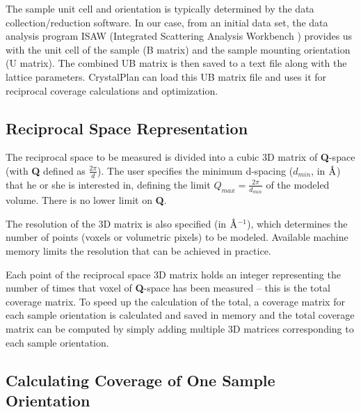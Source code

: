 \documentclass[final]{iucr}              %
\newcommand{\ang}{$\mathrm{\AA} $}
\begin{document}
The sample unit cell and orientation is typically determined by the data
collection/reduction software. In our case, from an initial data set, the data
analysis program ISAW (Integrated Scattering Analysis
Workbench \cite{Mikkelson05}) provides us with the unit cell of the sample (B
matrix) and the sample mounting orientation (U matrix).
The combined UB matrix is then saved to a
text file along with the lattice parameters. 
CrystalPlan can load this UB matrix file and uses it for reciprocal coverage
calculations and optimization.
    
  
\subsection{Reciprocal Space Representation}

The reciprocal space to be measured is divided into a cubic 3D matrix 
of {\bf Q}-space (with {\bf Q} defined as $\frac{2\pi}{d}$). 
The user specifies the minimum d-spacing ($d_{min}$, in \ang) 
that he or she is interested in, defining the limit
$Q_{max} = \frac{2\pi}{d_{min}}$ of the modeled volume. There is no lower limit
on {\bf Q}.

The resolution of the 3D matrix is also specified
(in \ang$^{-1}$), which determines the number of points (voxels or volumetric pixels) to be modeled. Available machine memory
limits the resolution that can be achieved in practice.

Each point of the reciprocal space 3D matrix holds an integer representing the 
number of times that voxel of {\bf Q}-space has
been measured -- this is the total coverage matrix. To speed up the
calculation of the total, a coverage matrix for each sample orientation is 
calculated and saved in memory and the total coverage
matrix can be computed by simply adding multiple 3D matrices corresponding to each sample orientation. 
 
\subsection{Calculating Coverage of One Sample Orientation}
\end{document}
